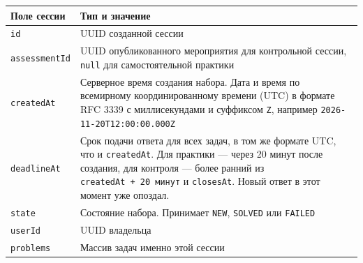 \documentclass[12pt,a4paper]{article}
\begin{document}
{\def\LTcaptype{none} %
\begin{longtable}[]{@{}
  >{\raggedright\arraybackslash}p{}
  >{\raggedright\arraybackslash}p{}@{}}
\toprule\noalign{}
\begin{minipage}[b]{\linewidth}\raggedright
Поле сессии
\end{minipage} & \begin{minipage}[b]{\linewidth}\raggedright
Тип и значение
\end{minipage} \\
\midrule\noalign{}
\endhead
\bottomrule\noalign{}
\endlastfoot
\texttt{id} & UUID созданной сессии \\
\texttt{assessmentId} & UUID опубликованного мероприятия для контрольной сессии, \texttt{null} для самостоятельной практики \\
\texttt{createdAt} & Серверное время создания набора. Дата и время по всемирному координированному времени (UTC) в формате RFC 3339 с миллисекундами и суффиксом \texttt{Z}, например \texttt{2026-\allowbreak{}11-\allowbreak{}20T12:00:00.\allowbreak{}000Z} \\
\texttt{deadlineAt} & Срок подачи ответа для всех задач, в том же формате UTC, что и \texttt{createdAt}. Для практики --- через 20 минут после создания, для контроля --- более ранний из \texttt{createdAt\ +\ 20\ минут} и \texttt{closesAt}. Новый ответ в этот момент уже опоздал. \\
\texttt{state} & Состояние набора. Принимает \texttt{NEW}, \texttt{SOLVED} или \texttt{FAILED} \\
\texttt{userId} & UUID владельца \\
\texttt{problems} & Массив задач именно этой сессии \\
\end{longtable}
}
\end{document}
